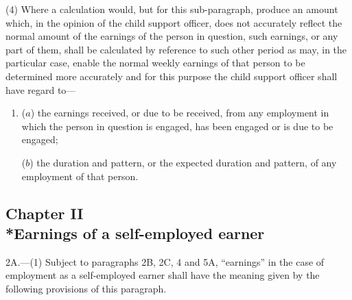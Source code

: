 \documentclass[12pt,a4paper]{article}
\begin{document}
(4) Where a calculation would, but for this sub-paragraph, produce an amount which, in the opinion of the child support officer, does not accurately reflect the normal amount of the earnings of the person in question, such earnings, or any part of them, shall be calculated by reference to such other period as may, in the particular case, enable the normal weekly earnings of that person to be determined more accurately and for this purpose the child support officer shall have regard to—
\begin{enumerate}\item[]
($a$) the earnings received, or due to be received, from any employment in which the person in question is engaged, has been engaged or is due to be engaged;

($b$) the duration and pattern, or the expected duration and pattern, of any employment of that person.
\end{enumerate}


\subsection[Chapter II --- Earnings of a self-employed earner]{Chapter II\\*Earnings of a self-employed earner}

\renewcommand\parthead{--- Schedule 1 Part I Chapter II}

2A.—(1) Subject to paragraphs 2B, 2C, 4 and 5A, “earnings” in the case of employment as a self-employed earner shall have the meaning given by the following provisions of this paragraph.
\end{document}
